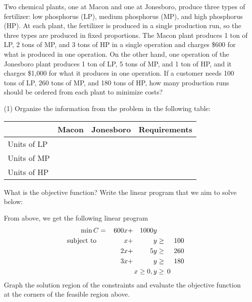 \documentclass[../mathNotesPreamble]{subfiles}
\begin{document}
  \begin{ex*}
    Two chemical plants, one at Macon and one at Jonesboro, produce three types of fertilizer: low phosphorus (LP), medium phosphorus (MP), and high phosphorus (HP). At each plant, the fertilizer is produced in a single production run, so the three types are produced in fixed proportions. The Macon plant produces 1 ton of LP, 2 tons of MP, and 3 tons of HP in a single operation and charges \$600 for what is produced in one operation. On the other hand, one operation of the Jonesboro plant produces 1 ton of LP, 5 tons of MP, and 1 ton of HP, and it charges \$1,000 for what it produces in one operation. If a customer needs 100 tons of LP, 260 tons of MP, and 180 tons of HP, how many production runs should be ordered from each plant to minimize costs?
  \end{ex*}
  \begin{extasks}[after-item-skip=3\baselineskip](1)
    \task Organize the information from the problem in the following table:

      \begin{tabularx}{0.8\linewidth}{@{}*{4}{X}@{}}\toprule
        & Macon& Jonesboro& Requirements\\\midrule
        Units of LP \\
        Units of MP \\
        Units of HP \\\bottomrule
      \end{tabularx}
    \task What is the objective function?
    \task Write the linear program that we aim to solve below:
  \end{extasks}
  \pagebreak

  \begin{ex*}
    From above, we get the following linear program
    \begin{alignat*}{4}
      \min C&=&\,600x&+&1000y\\
      \textnormal{subject to }&& x&+&y&\geq& 100\\
        &&2x&+&5y&\geq &\,260\\
        &&3x&+&y&\geq& 180\\
        &&&&\mathllap{x\geq 0}, y&\geq\mathrlap{\,0}&
    \end{alignat*}
    Graph the solution region of the constraints and evaluate the objective function at the corners of the feasible region above.
  \end{ex*}
\end{document}
